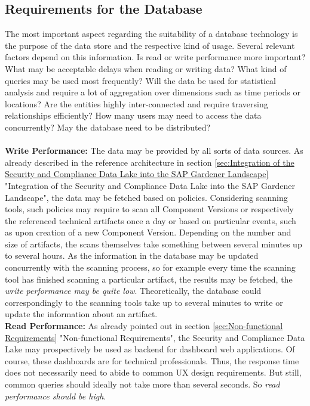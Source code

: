 \subsection{Requirements for the Database}
The most important aspect regarding the suitability of a database technology is the purpose of the data store and the respective kind of usage. Several relevant factors depend on this information. Is read or write performance more important? What may be acceptable delays when reading or writing data? What kind of queries may be used most frequently? Will the data be used for statistical analysis and require a lot of aggregation over dimensions such as time periods or locations? Are the entities highly inter-connected and require traversing relationships efficiently? How many users may need to access the data concurrently? May the database need to be distributed?\\\\
\textbf{Write Performance:} The data may be provided by all sorts of data sources. As already described in the reference architecture in section \ref{sec:Integration of the Security and Compliance Data Lake into the SAP Gardener Landscape} "Integration of the Security and Compliance Data Lake into the SAP Gardener Landscape", the data may be fetched based on policies. Considering scanning tools, such policies may require to scan all Component Versions or respectively the referenced technical artifacts once a day or based on particular events, such as upon creation of a new Component Version. Depending on the number and size of artifacts, the scans themselves take something between several minutes up to several hours. As the information in the database may be updated concurrently with the scanning process, so for example every time the scanning tool has finished scanning a particular artifact, the results may be fetched, the \emph{write performance may be quite low}. Theoretically, the database could correspondingly to the scanning tools take up to several minutes to write or update the information about an artifact.\\
\textbf{Read Performance:} As already pointed out in section \ref{sec:Non-functional Requirements} "Non-functional Requirements", the Security and Compliance Data Lake may prospectively be used as backend for dashboard web applications. Of course, these dashboards are for technical professionals. Thus, the response time does not necessarily need to abide to common UX design requirements. But still, common queries should ideally not take more than several seconds. So \emph{read performance should be high}.\\

